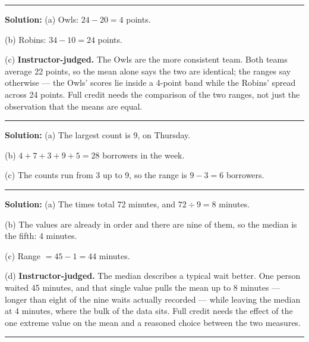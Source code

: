 \documentclass[12pt]{article}
\begin{document}
\vspace{0.25cm}\noindent\rule{\linewidth}{0.2pt}\vspace{0.25cm}


\textbf{Solution:} (a) Owls: $24 - 20 = 4$ points. 

(b) Robins: $34 - 10 = 24$ points. 

(c) \textbf{Instructor-judged.} The Owls are the more consistent team. Both
teams average 22 points, so the mean alone says the two are identical; the
ranges say otherwise --- the Owls' scores lie inside a 4-point band while the
Robins' spread across 24 points. Full credit needs the comparison of the two
ranges, not just the observation that the means are equal.

\vspace{0.25cm}\noindent\rule{\linewidth}{0.2pt}\vspace{0.25cm}


\textbf{Solution:} (a) The largest count is 9, on Thursday. 

(b) $4 + 7 + 3 + 9 + 5 = 28$ borrowers in the week. 

(c) The counts run from 3 up to 9, so the range is $9 - 3 = 6$
borrowers. 

\vspace{0.25cm}\noindent\rule{\linewidth}{0.2pt}\vspace{0.25cm}


\textbf{Solution:} (a) The times total 72 minutes, and $72 \div 9 = 8$
minutes. 

(b) The values are already in order and there are nine of them, so the median is
the fifth: 4 minutes. 

(c) Range $= 45 - 1 = 44$ minutes. 

(d) \textbf{Instructor-judged.} The median describes a typical wait better. One
person waited 45 minutes, and that single value pulls the mean up to 8 minutes
--- longer than eight of the nine waits actually recorded --- while leaving the
median at 4 minutes, where the bulk of the data sits. Full credit needs the
effect of the one extreme value on the mean and a reasoned choice between the
two measures.

\vspace{0.25cm}\noindent\rule{\linewidth}{0.2pt}\vspace{0.25cm}
\end{document}
